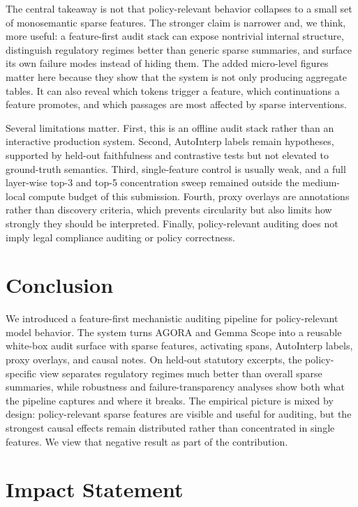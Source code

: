 \documentclass{article}
\begin{document}
The central takeaway is not that policy-relevant behavior collapses to a small set of monosemantic sparse features. The stronger claim is narrower and, we think, more useful: a feature-first audit stack can expose nontrivial internal structure, distinguish regulatory regimes better than generic sparse summaries, and surface its own failure modes instead of hiding them. The added micro-level figures matter here because they show that the system is not only producing aggregate tables. It can also reveal which tokens trigger a feature, which continuations a feature promotes, and which passages are most affected by sparse interventions.

Several limitations matter. First, this is an offline audit stack rather than an interactive production system. Second, AutoInterp labels remain hypotheses, supported by held-out faithfulness and contrastive tests but not elevated to ground-truth semantics. Third, single-feature control is usually weak, and a full layer-wise top-3 and top-5 concentration sweep remained outside the medium-local compute budget of this submission. Fourth, proxy overlays are annotations rather than discovery criteria, which prevents circularity but also limits how strongly they should be interpreted. Finally, policy-relevant auditing does not imply legal compliance auditing or policy correctness.

\section{Conclusion}

We introduced a feature-first mechanistic auditing pipeline for policy-relevant model behavior. The system turns AGORA and Gemma Scope into a reusable white-box audit surface with sparse features, activating spans, AutoInterp labels, proxy overlays, and causal notes. On held-out statutory excerpts, the policy-specific view separates regulatory regimes much better than overall sparse summaries, while robustness and failure-transparency analyses show both what the pipeline captures and where it breaks. The empirical picture is mixed by design: policy-relevant sparse features are visible and useful for auditing, but the strongest causal effects remain distributed rather than concentrated in single features. We view that negative result as part of the contribution.

\section*{Impact Statement}
\end{document}
